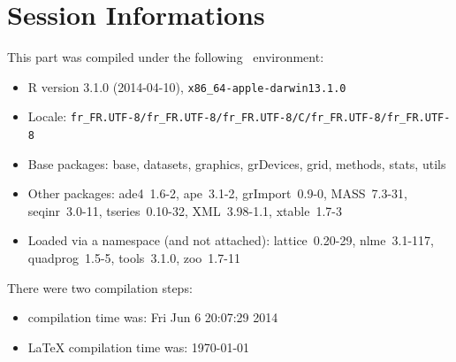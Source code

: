 \documentclass{article}
\begin{document}
%






\section*{Session Informations}

\begin{scriptsize}

This part was compiled under the following \Rlogo{}~environment:

\begin{itemize}\raggedright
  \item R version 3.1.0 (2014-04-10), \verb|x86_64-apple-darwin13.1.0|
  \item Locale: \verb|fr_FR.UTF-8/fr_FR.UTF-8/fr_FR.UTF-8/C/fr_FR.UTF-8/fr_FR.UTF-8|
  \item Base packages: base, datasets, graphics, grDevices, grid,
    methods, stats, utils
  \item Other packages: ade4~1.6-2, ape~3.1-2, grImport~0.9-0,
    MASS~7.3-31, seqinr~3.0-11, tseries~0.10-32, XML~3.98-1.1,
    xtable~1.7-3
  \item Loaded via a namespace (and not attached): lattice~0.20-29,
    nlme~3.1-117, quadprog~1.5-5, tools~3.1.0, zoo~1.7-11
\end{itemize}
There were two compilation steps:

\begin{itemize}
  \item \Rlogo{} compilation time was: Fri Jun  6 20:07:29 2014
  \item \LaTeX{} compilation time was: \today
\end{itemize}

\end{scriptsize}


\clearpage
{}


\end{document}
